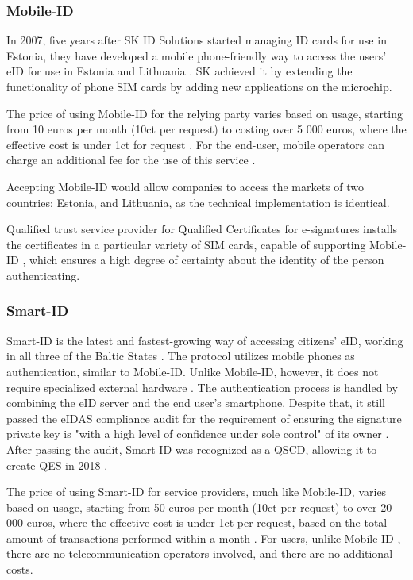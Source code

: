 \subsubsection{Mobile-ID}

In 2007, five years after SK ID Solutions started managing ID cards for use in Estonia, they have developed a mobile phone-friendly way to access the users' eID for use in Estonia and Lithuania \cite{sk-history2007}. SK achieved it by extending the functionality of phone SIM cards by adding new applications on the microchip.

The price of using Mobile-ID for the relying party varies based on usage, starting from 10 euros per month (10ct per request) to costing over 5 000 euros, where the effective cost is under 1ct for request \cite{sk-mobileidpricing}. For the end-user, mobile operators can charge an additional fee for the use of this service \cite{telia-mobileid}.

Accepting Mobile-ID would allow companies to access the markets of two countries: Estonia, and Lithuania, as the technical implementation is identical.

Qualified trust service provider for Qualified Certificates for e-signatures installs the certificates in a particular variety of SIM cards, capable of supporting Mobile-ID \cite{eu-trustservices}, which ensures a high degree of certainty about the identity of the person authenticating.

\subsubsection{Smart-ID}

Smart-ID is the latest and fastest-growing way of accessing citizens' eID, working in all three of the Baltic States \cite{sk-history2017}. The protocol utilizes mobile phones as authentication, similar to Mobile-ID. Unlike Mobile-ID, however, it does not require specialized external hardware \cite{smartid-docs}. The authentication process is handled by combining the eID server and the end user's smartphone. Despite that, it still passed the eIDAS compliance audit for the requirement of ensuring the signature private key is "with a high level of confidence under sole control" of its owner \cite{enisa-eidasreq}. After passing the audit, Smart-ID was recognized as a QSCD, allowing it to create QES in 2018 \cite{smartid-qscd}.

The price of using Smart-ID for service providers, much like Mobile-ID, varies based on usage, starting from 50 euros per month (10ct per request) to over 20 000 euros, where the effective cost is under 1ct per request, based on the total amount of transactions performed within a month \cite{sk-smartidpricing}. For users, unlike Mobile-ID \cite{telia-mobileid}, there are no telecommunication operators involved, and there are no additional costs.


